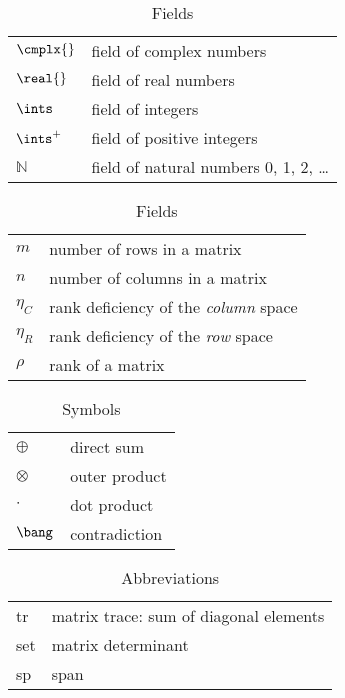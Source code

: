 \begin{table}[htdp]
\caption{Fields}
\begin{center}
\begin{tabular}{ll}
%
  $\cmplx{}$ & field of complex numbers \\
%
  $\real{}$ & field of real numbers \\
%
  $\ints$ & field of integers \\
%
  $\ints^{+}$ & field of positive integers \\
%
  $\mathbb{N}$ & field of natural numbers 0, 1, 2, \dots
%
\end{tabular}
\end{center}
\label{tab:notation:fields}
\end{table}


\begin{table}[htdp]
\caption{Fields}
\begin{center}
\begin{tabular}{ll}
%
  $m$ & number of rows in a matrix \\
%
  $n$ & number of columns in a matrix \\
%
  $\eta_{C}$ & rank deficiency of the \emph{column} space \\
%
  $\eta_{R}$ & rank deficiency of the \emph{row} space \\
%
  $\rho$ & rank of a matrix \\
%
\end{tabular}
\end{center}
\label{tab:notation:scalars}
\end{table}

\begin{table}[htdp]
\caption{Symbols}
\begin{center}
\begin{tabular}{ll}
%
  $\oplus$ & direct sum \\
%
  $\otimes$ & outer product \\
%
  $\cdot$ & dot product \\
%
  $\bang$ & contradiction
%
\end{tabular}
\end{center}
\label{tab:notation:symbols}
\end{table}

\begin{table}[htdp]
\caption{Abbreviations}
\begin{center}
\begin{tabular}{ll}
%
  tr & matrix trace: sum of diagonal elements \\
%
  set & matrix determinant \\
%
  sp & span \\
%
\end{tabular}
\end{center}
\label{tab:notation:abbreviations}
\end{table}

\endinput